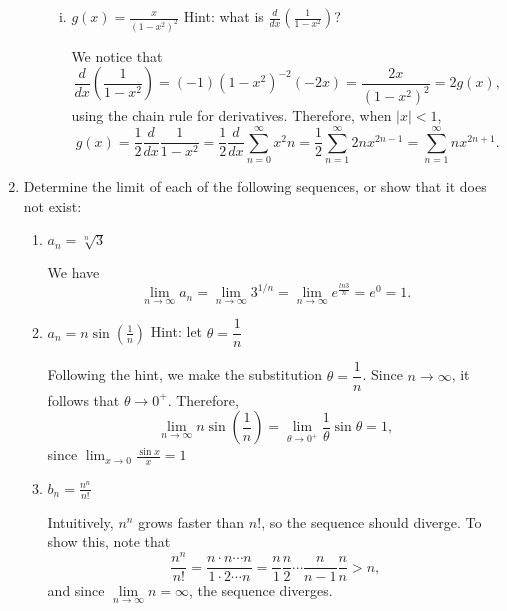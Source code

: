 \documentclass[12pt]{article}
\newcommand{\di}{\displaystyle}
\begin{document}
\begin{enumerate}
\begin{enumerate}
\begin{enumerate}[(i)]
\item $\di g(x) = \frac{x}{(1-x^2)^2}$\marginpar{[3]}\hspace{80pt}  Hint: what is $\di\frac{d}{dx}\left(\frac{1}{1-x^2}\right)$?

We notice that
\[
\frac{d}{dx}\left(\frac{1}{1-x^2}\right) = (-1)(1-x^2)^{-2}(-2x) = \frac{2x}{(1-x^2)^2}=2g(x),
\]
using the chain rule for derivatives.  Therefore, when $|x|<1$,
\[
g(x) = \frac{1}{2}\frac{d}{dx}\frac{1}{1-x^2} = \frac{1}{2}\frac{d}{dx}\sum_{n=0}^\infty x^2n = \frac{1}{2}\sum_{n=1}^\infty 2nx^{2n-1} = \sum_{n=1}^\infty nx^{2n+1}.
\]
\end{enumerate}
\end{enumerate}
\newpage
\item Determine the limit of each of the following sequences, or show that it does not exist:
\begin{enumerate}
\item $\di a_n = \sqrt[n]{3}$\marginpar{[2]}

\bigskip

We have
\[
\lim_{n\to\infty}a_n = \lim_{n\to\infty}3^{1/n} = \lim_{n\to\infty}e^{\frac{ln 3}{n}} = e^0=1.
\]
\vspace{2in}

\item $\di a_n = n\sin\left(\frac{1}{n}\right)$\marginpar{[3]}\hspace{100pt} Hint: let $\theta = \dfrac{1}{n}$

\bigskip

Following the hint, we make the substitution $\theta = \dfrac{1}{n}$.  Since $n\to\infty$, it follows that $\theta\to 0^+$.
Therefore,
\[
\lim_{n\to\infty}n\sin\left(\frac{1}{n}\right) = \lim_{\theta\to 0^+}\frac{1}{\theta}\sin\theta = 1,
\]
since $\di \lim_{x\to 0}\frac{\sin x}{x} = 1$
\vspace{1in}

\item $\di b_n = \frac{n^n}{n!}$\marginpar{[3]}

\bigskip

Intuitively, $n^n$ grows faster than $n!$, so the sequence should diverge.  To show this, note that
\[
\frac{n^n}{n!} = \frac{n\cdot n\cdots n}{1\cdot 2\cdots n} = \frac{n}{1}\frac{n}{2}\cdots \frac{n}{n-1}\frac{n}{n}>n,
\]
and since $\lim\limits_{n\to\infty} n = \infty$, the sequence diverges.
\end{enumerate}
\end{enumerate}
\end{document}
